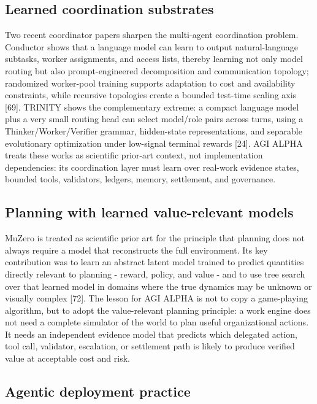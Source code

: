 \documentclass[
  11pt,
]{article}
\begin{document}
\subsection{Learned coordination
substrates}\label{learned-coordination-substrates}

Two recent coordinator papers sharpen the multi-agent coordination
problem. Conductor shows that a language model can learn to output
natural-language subtasks, worker assignments, and access lists, thereby
learning not only model routing but also prompt-engineered decomposition
and communication topology; randomized worker-pool training supports
adaptation to cost and availability constraints, while recursive
topologies create a bounded test-time scaling axis {[}69{]}. TRINITY
shows the complementary extreme: a compact language model plus a very
small routing head can select model/role pairs across turns, using a
Thinker/Worker/Verifier grammar, hidden-state representations, and
separable evolutionary optimization under low-signal terminal rewards
{[}24{]}. AGI ALPHA treats these works as scientific prior-art context,
not implementation dependencies: its coordination layer must learn over
real-work evidence states, bounded tools, validators, ledgers, memory,
settlement, and governance.

\subsection{Planning with learned value-relevant
models}\label{planning-with-learned-value-relevant-models}

MuZero is treated as scientific prior art for the principle that
planning does not always require a model that reconstructs the full
environment. Its key contribution was to learn an abstract latent model
trained to predict quantities directly relevant to planning - reward,
policy, and value - and to use tree search over that learned model in
domains where the true dynamics may be unknown or visually complex
{[}72{]}. The lesson for AGI ALPHA is not to copy a game-playing
algorithm, but to adopt the value-relevant planning principle: a work
engine does not need a complete simulator of the world to plan useful
organizational actions. It needs an independent evidence model that
predicts which delegated action, tool call, validator, escalation, or
settlement path is likely to produce verified value at acceptable cost
and risk.

\subsection{Agentic deployment
practice}\label{agentic-deployment-practice}
\end{document}
